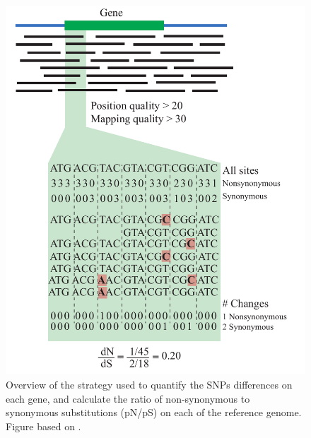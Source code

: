 \begin{figure}[!hbtp]
  \centering
  \includegraphics[width=\textwidth]{Chapter5/Figures/MappingStrategy.pdf}
  \caption{Overview of the strategy used to quantify the SNPs differences on each gene, and calculate the ratio of non-synonymous to synonymous substitutions (pN/pS) on each of the reference genome. Figure based on \cite{Tai:2011jo}.}
  \label{MappingStrategy}
\end{figure}

